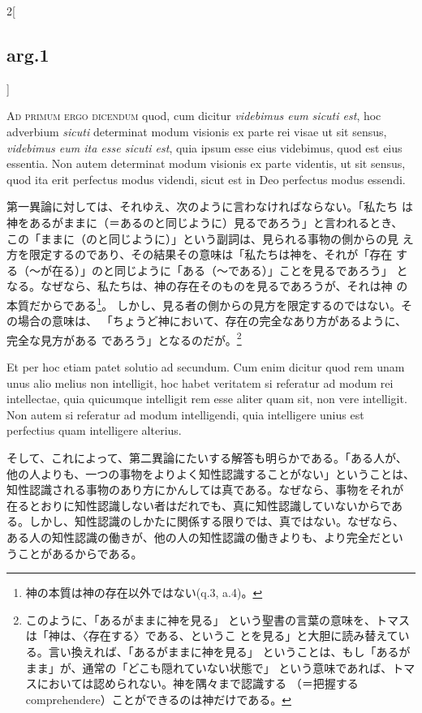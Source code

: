 \documentclass[paper=a4paper,fontsize=10pt,jafontsize=9pt,titlepage]{jlreq}
\begin{document}
\begin{paracol}{2}[\subsection{arg.1}]
\switchcolumn*[\subsection{ad.1}]

{\scshape Ad primum ergo dicendum} quod, cum dicitur {\itshape videbimus eum
sicuti est}, hoc adverbium {\itshape sicuti} determinat modum visionis ex
parte rei visae ut sit sensus, {\itshape videbimus eum ita esse sicuti
est}, quia ipsum esse eius videbimus, quod est eius essentia. Non
autem determinat modum visionis ex parte videntis, ut sit sensus, quod
ita erit perfectus modus videndi, sicut est in Deo perfectus modus
essendi.

\switchcolumn

第一異論に対しては、それゆえ、次のように言わなければならない。「私たち
は神をあるがままに（＝あるのと同じように）見るであろう」と言われるとき、
この「ままに（のと同じように）」という副詞は、見られる事物の側からの見
え方を限定するのであり、その結果その意味は「私たちは神を、それが「存在
する（〜が在る）」のと同じように「ある（〜である）」ことを見るであろう」
となる。なぜなら、私たちは、神の存在そのものを見るであろうが、それは神
の本質だからである\footnote{神の本質は神の存在以外ではない(q.3, a.4)。}。
しかし、見る者の側からの見方を限定するのではない。その場合の意味は、
「ちょうど神において、存在の完全なあり方があるように、完全な見方がある
であろう」となるのだが。\footnote{このように、「あるがままに神を見る」
という聖書の言葉の意味を、トマスは「神は、〈存在する〉である、というこ
とを見る」と大胆に読み替えている。言い換えれば、「あるがままに神を見る」
ということは、もし「あるがまま」が、通常の「どこも隠れていない状態で」
という意味であれば、トマスにおいては認められない。神を隅々まで認識する
（＝把握するcomprehendere）ことができるのは神だけである。}

\switchcolumn*

Et per hoc etiam patet solutio ad secundum. Cum enim dicitur quod rem
unam unus alio melius non intelligit, hoc habet veritatem si referatur
ad modum rei intellectae, quia quicumque intelligit rem esse aliter
quam sit, non vere intelligit. Non autem si referatur ad modum
intelligendi, quia intelligere unius est perfectius quam intelligere
alterius.

\switchcolumn

そして、これによって、第二異論にたいする解答も明らかである。「ある人が、
他の人よりも、一つの事物をよりよく知性認識することがない」ということは、
知性認識される事物のあり方にかんしては真である。なぜなら、事物をそれが
在るとおりに知性認識しない者はだれでも、真に知性認識していないからであ
る。しかし、知性認識のしかたに関係する限りでは、真ではない。なぜなら、
ある人の知性認識の働きが、他の人の知性認識の働きよりも、より完全だとい
うことがあるからである。


\end{paracol}
\end{document}
